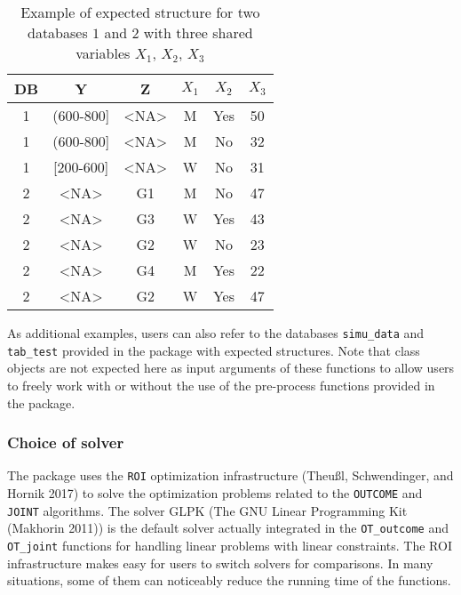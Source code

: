 \begin{table}[h]
 \begin{center}
  \begin{tabular}{cccccc}
    \toprule
    DB & Y & Z & $X_1$ & $X_2$ & $X_3$ \\
    \hline
   1 & (600-800] & <NA> & M & Yes &  50 \\
   1 & (600-800] & <NA> & M & No  &  32 \\
   1 & [200-600] & <NA> & W & No  &  31 \\
   2 &  <NA>     &  G1  & M & No  &  47 \\
   2 &  <NA>     &  G3  & W & Yes &  43 \\
   2 &  <NA>     &  G2  & W & No  &  23 \\
   2 &  <NA>     &  G4  & M & Yes &  22 \\
   2 &  <NA>     &  G2  & W & Yes &  47 \\
   \bottomrule
  \end{tabular} \end{center}\caption{Example of expected structure for two databases $1$ and $2$  with three shared variables $X_1$, $X_2$, $X_3$}
\label{tab:tab3}
\end{table}

As additional examples, users can also refer to the databases \texttt{simu\_data} and \texttt{tab\_test} provided in the package with expected structures. Note that class objects are not expected here as input arguments of these functions to allow users to freely work with or without the use of the pre-process functions provided in the package.

\hypertarget{choice-of-solver}{%
\subsubsection{Choice of solver}\label{choice-of-solver}}

The package  uses the \texttt{ROI} optimization infrastructure (Theußl, Schwendinger, and Hornik 2017) to solve the optimization problems related to the \texttt{OUTCOME} and \texttt{JOINT} algorithms. The solver GLPK (The GNU Linear Programming Kit (Makhorin 2011)) is the default solver actually integrated in the \texttt{OT\_outcome} and \texttt{OT\_joint} functions for handling linear problems with linear constraints. The ROI infrastructure makes easy for users to switch solvers for comparisons. In many situations, some of them can noticeably reduce the running time of the functions.

